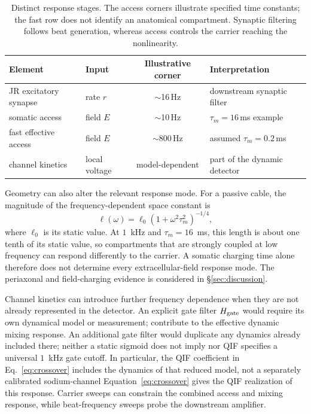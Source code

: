 \documentclass[11pt,a4paper]{article}
\providecommand{\DIFaddtex}[1]{{\protect\color{blue} \sf #1}} %
\providecommand{\DIFdeltex}[1]{{\protect\color{red} \scriptsize #1}} %
\providecommand{\DIFaddbegin}{} %
\providecommand{\DIFaddend}{} %
\providecommand{\DIFdelbegin}{} %
\providecommand{\DIFdelend}{} %
\providecommand{\DIFadd}[1]{\texorpdfstring{\DIFaddtex{#1}}{#1}} %
\providecommand{\DIFdel}[1]{\texorpdfstring{\DIFdeltex{#1}}{}} %
\begin{document}
\begin{table}[h]
\centering\small
\renewcommand{\arraystretch}{1.15}
\begin{tabular}{@{}p{4.3cm} l c p{3.3cm}@{}}
\toprule
Element & Input & Illustrative corner & Interpretation \\
\midrule
JR excitatory synapse & rate $r$ & $\sim$16\,Hz & downstream synaptic filter \\
somatic access & field $E$ & $\sim$10\,Hz & $\tau_m=16$\,ms example \\
fast effective access & field $E$ & $\sim$800\,Hz & assumed $\tau_m=0.2$\,ms \\
channel kinetics & local voltage & model-dependent & part of the dynamic detector \\
\bottomrule
\end{tabular}
\caption{Distinct response stages. The access corners illustrate specified time
constants; the fast row does not identify an anatomical compartment. Synaptic
filtering follows beat generation, whereas access controls the carrier reaching
the nonlinearity.}
\label{tab:doors}
\end{table}

Geometry can also alter the relevant response mode. For a passive cable, the
magnitude of the frequency-dependent space constant is
\begin{equation}
\ell(\omega)=\ell_0(1+\omega^2\tau_m^2)^{-1/4},
\label{eq:lambda}
\end{equation}
where $\ell_0$ is its static value. At $1$~kHz and $\tau_m=16$~ms, this length
is about one tenth of its static value, so compartments that are strongly coupled
at low frequency can respond differently to the carrier. A somatic charging time
alone therefore does not determine every extracellular-field response mode.
The periaxonal and field-charging evidence is considered in \S\ref{sec:discussion}.

Channel kinetics \DIFdelbegin \DIFdel{can introduce further frequency dependence when they are not
already represented in the detector. An
explicit gate filter $H_{\rm gate}$
would require its own dynamical model or measurement;
}\DIFdelend \DIFaddbegin \DIFadd{contribute to the effective dynamic mixing response. An
additional gate filter would duplicate any dynamics already included there;
neither }\DIFaddend a static sigmoid \DIFdelbegin \DIFdel{does not
imply }\DIFdelend \DIFaddbegin \DIFadd{nor QIF specifies }\DIFaddend a universal $1$~kHz gate cutoff.
\DIFdelbegin \DIFdel{In particular, the QIF coefficient in
Eq.~\eqref{eq:crossover} includes the dynamics of that reduced model, not a
separately calibrated sodium-channel }\DIFdelend \DIFaddbegin \DIFadd{Equation~\eqref{eq:crossover} gives the QIF realization of this }\DIFaddend response.
Carrier sweeps can constrain the
combined access and mixing response, while beat-frequency sweeps probe the
downstream amplifier.
\end{document}
